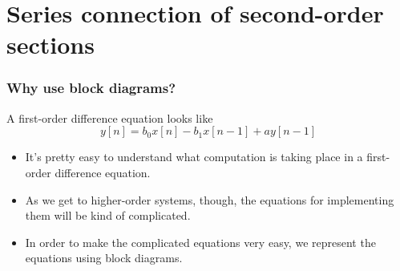 \documentclass{beamer}
\begin{document}
\section[Series]{Series connection of second-order sections}

\begin{frame}
  \frametitle{Why use block diagrams?}

  A first-order difference equation looks like
  \[
  y[n] = b_0x[n]-b_1x[n-1] +ay[n-1]
  \]
  \begin{itemize}
  \item It's pretty easy to understand what computation is taking
    place in a first-order difference equation.
  \item As we get to higher-order systems, though, the equations for
    implementing them will be kind of complicated.
  \item In order to make the complicated equations very easy, we
    represent the equations using block diagrams.
  \end{itemize}
\end{frame}
\end{document}
